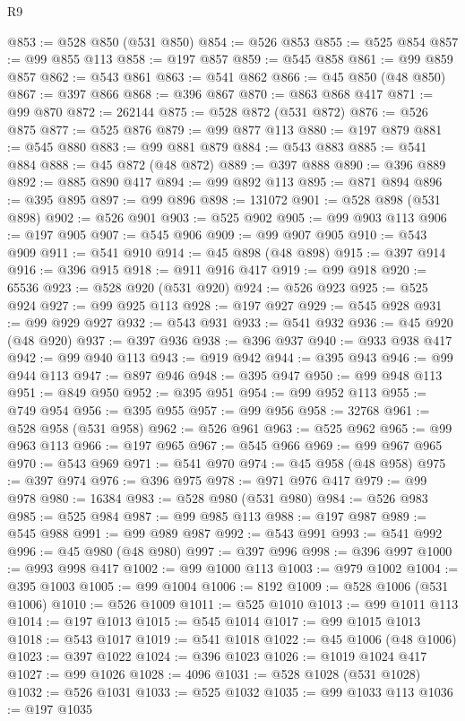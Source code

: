 \begin{lexlean}{R9}
\begin{coremodule}
@853 := @528 @850 (@531 @850)
@854 := @526 @853
@855 := @525 @854
@857 := @99 @855 @113
@858 := @197 @857
@859 := @545 @858
@861 := @99 @859 @857
@862 := @543 @861
@863 := @541 @862
@866 := @45 @850 (@48 @850)
@867 := @397 @866
@868 := @396 @867
@870 := @863 @868 @417
@871 := @99 @870
@872 := 262144
@875 := @528 @872 (@531 @872)
@876 := @526 @875
@877 := @525 @876
@879 := @99 @877 @113
@880 := @197 @879
@881 := @545 @880
@883 := @99 @881 @879
@884 := @543 @883
@885 := @541 @884
@888 := @45 @872 (@48 @872)
@889 := @397 @888
@890 := @396 @889
@892 := @885 @890 @417
@894 := @99 @892 @113
@895 := @871 @894
@896 := @395 @895
@897 := @99 @896
@898 := 131072
@901 := @528 @898 (@531 @898)
@902 := @526 @901
@903 := @525 @902
@905 := @99 @903 @113
@906 := @197 @905
@907 := @545 @906
@909 := @99 @907 @905
@910 := @543 @909
@911 := @541 @910
@914 := @45 @898 (@48 @898)
@915 := @397 @914
@916 := @396 @915
@918 := @911 @916 @417
@919 := @99 @918
@920 := 65536
@923 := @528 @920 (@531 @920)
@924 := @526 @923
@925 := @525 @924
@927 := @99 @925 @113
@928 := @197 @927
@929 := @545 @928
@931 := @99 @929 @927
@932 := @543 @931
@933 := @541 @932
@936 := @45 @920 (@48 @920)
@937 := @397 @936
@938 := @396 @937
@940 := @933 @938 @417
@942 := @99 @940 @113
@943 := @919 @942
@944 := @395 @943
@946 := @99 @944 @113
@947 := @897 @946
@948 := @395 @947
@950 := @99 @948 @113
@951 := @849 @950
@952 := @395 @951
@954 := @99 @952 @113
@955 := @749 @954
@956 := @395 @955
@957 := @99 @956
@958 := 32768
@961 := @528 @958 (@531 @958)
@962 := @526 @961
@963 := @525 @962
@965 := @99 @963 @113
@966 := @197 @965
@967 := @545 @966
@969 := @99 @967 @965
@970 := @543 @969
@971 := @541 @970
@974 := @45 @958 (@48 @958)
@975 := @397 @974
@976 := @396 @975
@978 := @971 @976 @417
@979 := @99 @978
@980 := 16384
@983 := @528 @980 (@531 @980)
@984 := @526 @983
@985 := @525 @984
@987 := @99 @985 @113
@988 := @197 @987
@989 := @545 @988
@991 := @99 @989 @987
@992 := @543 @991
@993 := @541 @992
@996 := @45 @980 (@48 @980)
@997 := @397 @996
@998 := @396 @997
@1000 := @993 @998 @417
@1002 := @99 @1000 @113
@1003 := @979 @1002
@1004 := @395 @1003
@1005 := @99 @1004
@1006 := 8192
@1009 := @528 @1006 (@531 @1006)
@1010 := @526 @1009
@1011 := @525 @1010
@1013 := @99 @1011 @113
@1014 := @197 @1013
@1015 := @545 @1014
@1017 := @99 @1015 @1013
@1018 := @543 @1017
@1019 := @541 @1018
@1022 := @45 @1006 (@48 @1006)
@1023 := @397 @1022
@1024 := @396 @1023
@1026 := @1019 @1024 @417
@1027 := @99 @1026
@1028 := 4096
@1031 := @528 @1028 (@531 @1028)
@1032 := @526 @1031
@1033 := @525 @1032
@1035 := @99 @1033 @113
@1036 := @197 @1035

\end{coremodule}
\end{lexlean}
